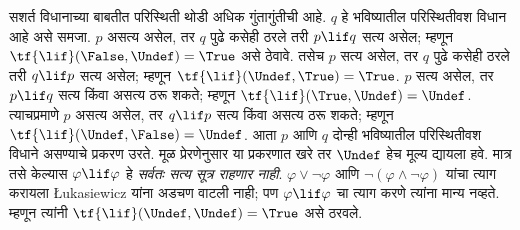 सशर्त विधानाच्या बाबतीत परिस्थिती थोडी अधिक गुंतागुंतीची आहे.
$q$ हे भविष्यातील परिस्थितीवश विधान आहे असे समजा. $p$ असत्य
असेल, तर $q$ पुढे कसेही ठरले तरी $p \lif q$ सत्य असेल; म्हणून
$\tf{\lif}(\False, \Undef) = \True$ असे ठेवावे. तसेच $p$
सत्य असेल, तर $q$ पुढे कसेही ठरले तरी $q \lif p$ सत्य असेल;
म्हणून $\tf{\lif}(\Undef, \True) = \True$. $p$ सत्य असेल,
तर $p \lif q$ सत्य किंवा असत्य ठरू शकते; म्हणून
$\tf{\lif}(\True, \Undef) = \Undef$. त्याचप्रमाणे $p$
असत्य असेल, तर $q \lif p$ सत्य किंवा असत्य ठरू शकते;
म्हणून $\tf{\lif}(\Undef, \False) = \Undef$. आता $p$
आणि $q$ दोन्ही भविष्यातील परिस्थितीवश विधाने असण्याचे
प्रकरण उरते. मूळ प्रेरणेनुसार या प्रकरणात खरे तर $\Undef$
हेच मूल्य द्यायला हवे. मात्र तसे केल्यास $\varphi \lif \varphi$
हे \emph{सर्वतः सत्य सूत्र राहणार नाही}. $\varphi \lor \lnot \varphi$
आणि $\lnot(\varphi \land \lnot \varphi)$ यांचा त्याग करायला
\L ukasiewicz यांना अडचण वाटली नाही; पण $\varphi \lif \varphi$
चा त्याग करणे त्यांना मान्य नव्हते. म्हणून त्यांनी
$\tf{\lif}(\Undef, \Undef) = \True$ असे ठरवले.

